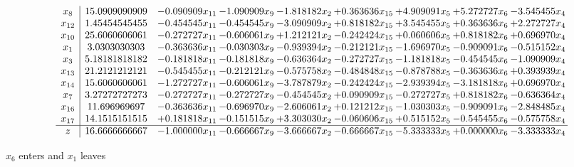 \documentclass[10pt]{article}
\begin{document}
 \[\begin{array}{c| c c@{\hskip 2pt} c@{\hskip 2pt} c@{\hskip 2pt} c@{\hskip 2pt} c@{\hskip 2pt} c@{\hskip 2pt} c@{\hskip 2pt} }
 x_{8}   &  15.0909090909 & -0.090909 x_{11} & -1.090909 x_{9} & -1.818182 x_{2} & + 0.363636 x_{15} & + 4.909091 x_{5} & + 5.272727 x_{6} & -3.545455 x_{4}\\
 x_{12}   &  1.45454545455 & -0.454545 x_{11} & -0.454545 x_{9} & -3.090909 x_{2} & + 0.818182 x_{15} & + 3.545455 x_{5} & + 0.363636 x_{6} & + 2.272727 x_{4}\\
 x_{10}   &  25.6060606061 & -0.272727 x_{11} & -0.606061 x_{9} & + 1.212121 x_{2} & -0.242424 x_{15} & + 0.060606 x_{5} & + 0.818182 x_{6} & + 0.696970 x_{4}\\
 x_{1}   &  3.0303030303 & -0.363636 x_{11} & -0.030303 x_{9} & -0.939394 x_{2} & -0.212121 x_{15} & -1.696970 x_{5} & -0.909091 x_{6} & -0.515152 x_{4}\\
 x_{3}   &  5.18181818182 & -0.181818 x_{11} & -0.181818 x_{9} & -0.636364 x_{2} & -0.272727 x_{15} & -1.181818 x_{5} & -0.454545 x_{6} & -1.090909 x_{4}\\
 x_{13}   &  21.2121212121 & -0.545455 x_{11} & -0.212121 x_{9} & -0.575758 x_{2} & -0.484848 x_{15} & -0.878788 x_{5} & -0.363636 x_{6} & + 0.393939 x_{4}\\
 x_{14}   &  15.6060606061 & -1.272727 x_{11} & -0.606061 x_{9} & -3.787879 x_{2} & -0.242424 x_{15} & -2.939394 x_{5} & -3.181818 x_{6} & + 0.696970 x_{4}\\
 x_{7}   &  3.27272727273 & -0.272727 x_{11} & -0.272727 x_{9} & -0.454545 x_{2} & + 0.090909 x_{15} & -0.272727 x_{5} & + 0.818182 x_{6} & -0.636364 x_{4}\\
 x_{16}   &  11.696969697 & -0.363636 x_{11} & -0.696970 x_{9} & -2.606061 x_{2} & + 0.121212 x_{15} & -1.030303 x_{5} & -0.909091 x_{6} & -2.848485 x_{4}\\
 x_{17}   &  14.1515151515 & + 0.181818 x_{11} & -0.151515 x_{9} & + 3.303030 x_{2} & -0.060606 x_{15} & + 0.515152 x_{5} & -0.545455 x_{6} & -0.575758 x_{4}\\
\hline
z    &  16.6666666667 & -1.000000 x_{11} & -0.666667 x_{9} & -3.666667 x_{2} & -0.666667 x_{15} & -5.333333 x_{5} & + 0.000000 x_{6} & -3.333333 x_{4}\\
\end{array}\]


 $ x_{6} $ enters and $ x_{1} $ leaves 
\end{document}
